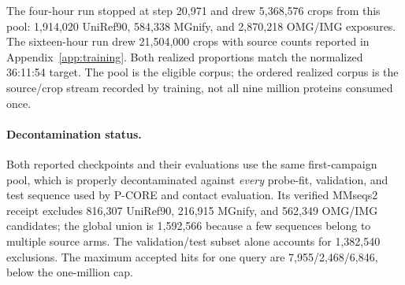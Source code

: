 \documentclass{article}
\begin{document}
\begin{table}[H]
  \centering
  \scriptsize
  \setlength{\tabcolsep}{3.0pt}
  \caption{Actual materialized first-campaign pool. Rejections apply only to the original-source prefixes scanned before all targets were filled; the homology search found 1,592,566 unique exclusions across the larger screened prefixes. Protein and residue counts are explicitly separated.}
  \label{tab:first-corpus}
\end{table}

The four-hour run stopped at step 20,971 and drew 5,368,576 crops from this
pool: 1,914,020 UniRef90, 584,338 MGnify, and 2,870,218 OMG/IMG exposures. The
sixteen-hour run drew 21,504,000 crops with source counts reported in
Appendix~\ref{app:training}. Both realized proportions match the normalized
36:11:54 target. The pool is the eligible corpus; the ordered realized corpus
is the source/crop stream recorded by training, not all nine million proteins
consumed once.

\paragraph{Decontamination status.}
Both reported checkpoints and their evaluations use the same first-campaign
pool, which is properly decontaminated against
\emph{every} probe-fit, validation, and test sequence used by P-CORE and
contact evaluation. Its verified MMseqs2 receipt excludes 816,307 UniRef90,
216,915 MGnify, and 562,349 OMG/IMG candidates; the global union is 1,592,566
because a few sequences belong to multiple source arms. The validation/test
subset alone accounts for 1,382,540 exclusions. The maximum accepted hits for
one query are 7,955/2,468/6,846, below the one-million cap.
\end{document}
